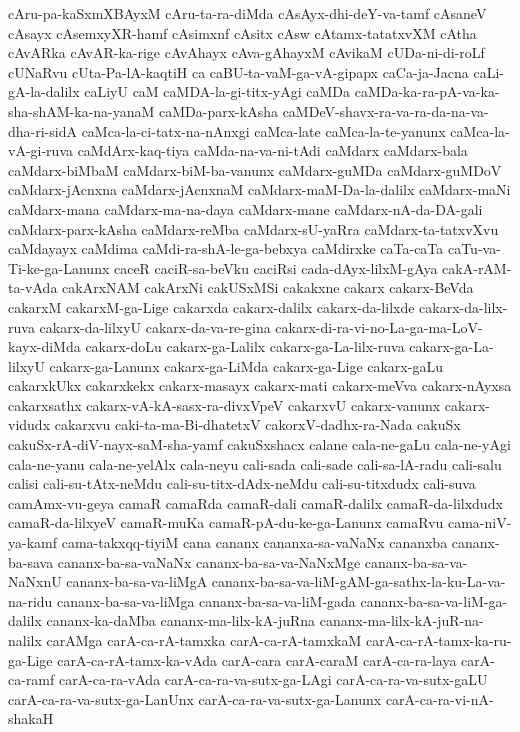 {cAru-pa-kaSxmXBAyxM
cAru-ta-ra-diMda
cAsAyx-dhi-deY-va-tamf
cAsaneV
cAsayx
cAsemxyXR-hamf
cAsimxnf
cAsitx
cAsw
cAtamx-tatatxvXM
cAtha
cAvARka
cAvAR-ka-rige
cAvAhayx
cAva-gAhayxM
cAvikaM
cUDa-ni-di-roLf
cUNaRvu
cUta-Pa-lA-kaqtiH
ca
caBU-ta-vaM-ga-vA-gipapx
caCa-ja-Jacna
caLi-gA-la-dalilx
caLiyU
caM
caMDA-la-gi-titx-yAgi
caMDa
caMDa-ka-ra-pA-va-ka-sha-shAM-ka-na-yanaM
caMDa-parx-kAsha
caMDeV-shavx-ra-va-ra-da-na-va-dha-ri-sidA
caMca-la-ci-tatx-na-nAnxgi
caMca-late
caMca-la-te-yanunx
caMca-la-vA-gi-ruva
caMdArx-kaq-tiya
caMda-na-va-ni-tAdi
caMdarx
caMdarx-bala
caMdarx-biMbaM
caMdarx-biM-ba-vanunx
caMdarx-guMDa
caMdarx-guMDoV
caMdarx-jAcnxna
caMdarx-jAcnxnaM
caMdarx-maM-Da-la-dalilx
caMdarx-maNi
caMdarx-mana
caMdarx-ma-na-daya
caMdarx-mane
caMdarx-nA-da-DA-gali
caMdarx-parx-kAsha
caMdarx-reMba
caMdarx-sU-yaRra
caMdarx-ta-tatxvXvu
caMdayayx
caMdima
caMdi-ra-shA-le-ga-bebxya
caMdirxke
caTa-caTa
caTu-va-Ti-ke-ga-Lanunx
caceR
caciR-sa-beVku
caciRsi
cada-dAyx-lilxM-gAya
cakA-rAM-ta-vAda
cakArxNAM
cakArxNi
cakUSxMSi
cakakxne
cakarx
cakarx-BeVda
cakarxM
cakarxM-ga-Lige
cakarxda
cakarx-dalilx
cakarx-da-lilxde
cakarx-da-lilx-ruva
cakarx-da-lilxyU
cakarx-da-va-re-gina
cakarx-di-ra-vi-no-La-ga-ma-LoV-kayx-diMda
cakarx-doLu
cakarx-ga-Lalilx
cakarx-ga-La-lilx-ruva
cakarx-ga-La-lilxyU
cakarx-ga-Lanunx
cakarx-ga-LiMda
cakarx-ga-Lige
cakarx-gaLu
cakarxkUkx
cakarxkekx
cakarx-masayx
cakarx-mati
cakarx-meVva
cakarx-nAyxsa
cakarxsathx
cakarx-vA-kA-sasx-ra-divxVpeV
cakarxvU
cakarx-vanunx
cakarx-vidudx
cakarxvu
caki-ta-ma-Bi-dhatetxV
cakorxV-dadhx-ra-Nada
cakuSx
cakuSx-rA-diV-nayx-saM-sha-yamf
cakuSxshacx
calane
cala-ne-gaLu
cala-ne-yAgi
cala-ne-yanu
cala-ne-yelAlx
cala-neyu
cali-sada
cali-sade
cali-sa-lA-radu
cali-salu
calisi
cali-su-tAtx-neMdu
cali-su-titx-dAdx-neMdu
cali-su-titxdudx
cali-suva
camAmx-vu-geya
camaR
camaRda
camaR-dali
camaR-dalilx
camaR-da-lilxdudx
camaR-da-lilxyeV
camaR-muKa
camaR-pA-du-ke-ga-Lanunx
camaRvu
cama-niV-ya-kamf
cama-takxqq-tiyiM
cana
cananx
cananxa-sa-vaNaNx
cananxba
cananx-ba-sava
cananx-ba-sa-vaNaNx
cananx-ba-sa-va-NaNxMge
cananx-ba-sa-va-NaNxnU
cananx-ba-sa-va-liMgA
cananx-ba-sa-va-liM-gAM-ga-sathx-la-ku-La-va-na-ridu
cananx-ba-sa-va-liMga
cananx-ba-sa-va-liM-gada
cananx-ba-sa-va-liM-ga-dalilx
cananx-ka-daMba
cananx-ma-lilx-kA-juRna
cananx-ma-lilx-kA-juR-na-nalilx
carAMga
carA-ca-rA-tamxka
carA-ca-rA-tamxkaM
carA-ca-rA-tamx-ka-ru-ga-Lige
carA-ca-rA-tamx-ka-vAda
carA-cara
carA-caraM
carA-ca-ra-laya
carA-ca-ramf
carA-ca-ra-vAda
carA-ca-ra-va-sutx-ga-LAgi
carA-ca-ra-va-sutx-gaLU
carA-ca-ra-va-sutx-ga-LanUnx
carA-ca-ra-va-sutx-ga-Lanunx
carA-ca-ra-vi-nA-shakaH
}
